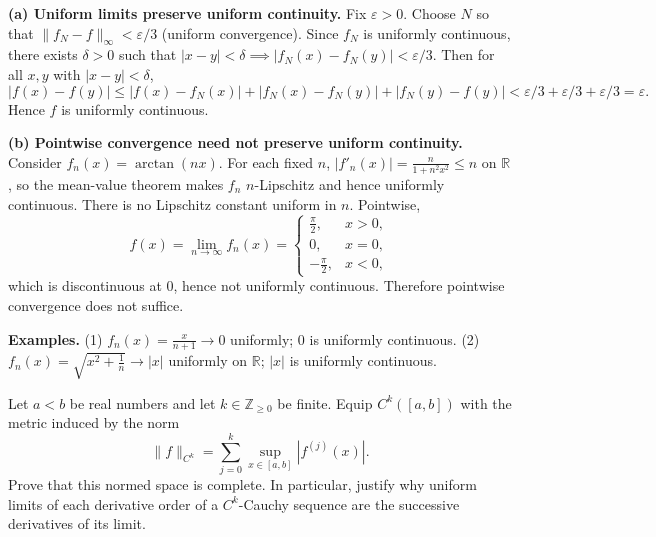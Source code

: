 \begin{solution}
\par\medskip\noindent\textbf{(a) Uniform limits preserve uniform continuity.}\quad 
Fix $\varepsilon>0$. Choose $N$ so that $\|f_N-f\|_\infty<\varepsilon/3$ (uniform convergence).
Since $f_N$ is uniformly continuous, there exists $\delta>0$ such that
$|x-y|<\delta \implies |f_N(x)-f_N(y)|<\varepsilon/3$.
Then for all $x,y$ with $|x-y|<\delta$,
\[
|f(x)-f(y)|
\le |f(x)-f_N(x)| + |f_N(x)-f_N(y)| + |f_N(y)-f(y)|
< \varepsilon/3 + \varepsilon/3 + \varepsilon/3
= \varepsilon.
\]
Hence $f$ is uniformly continuous.

\par\medskip\noindent\textbf{(b) Pointwise convergence need not preserve uniform continuity.}\quad 
Consider $f_n(x)=\arctan(n x)$. For each fixed $n$, $|f'_n(x)|=\frac{n}{1+n^2x^2}\le n$ on $\mathbb R$, so the mean-value theorem makes $f_n$ $n$-Lipschitz and hence uniformly continuous. There is no Lipschitz constant uniform in $n$.
Pointwise,
\[
f(x)=\lim_{n\to\infty} f_n(x)=
\begin{cases}
	\frac{\pi}{2}, & x>0,\\
	0, & x=0,\\
	-\frac{\pi}{2}, & x<0,
\end{cases}
\]
which is discontinuous at $0$, hence not uniformly continuous. Therefore pointwise convergence does not suffice.

\par\medskip\noindent\textbf{Examples.}\quad 
(1) $f_n(x)=\frac{x}{n+1}\to 0$ uniformly; $0$ is uniformly continuous. \quad
(2) $f_n(x)=\sqrt{x^2+\frac1n}\to |x|$ uniformly on $\mathbb{R}$; $|x|$ is uniformly continuous.
\end{solution}

\begin{problem}[CP-IV-0067]
\label{prob:cp-iv-0067}
Let $a<b$ be real numbers and let $k\in\mathbb Z_{\ge0}$ be finite.
Equip $C^k([a,b])$ with the metric induced by the norm
\[
\|f\|_{C^k}=\sum_{j=0}^{k}\sup_{x\in[a,b]}|f^{(j)}(x)|.
\]
Prove that this normed space is complete. In particular, justify why
uniform limits of each derivative order of a $C^k$-Cauchy sequence
are the successive derivatives of its limit.
\end{problem}

